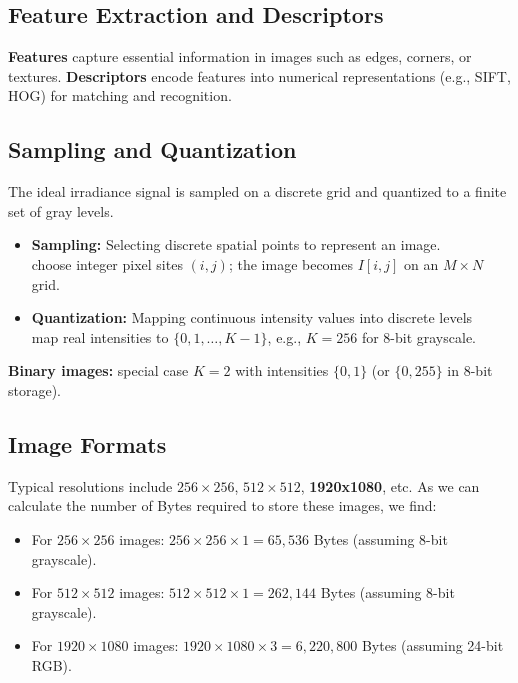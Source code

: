 \subsection{Feature Extraction and Descriptors}
\textbf{Features} capture essential information in images such as edges, corners, or textures.  
\textbf{Descriptors} encode features into numerical representations (e.g., SIFT, HOG) for matching and recognition.

\subsection{Sampling and Quantization}
The ideal irradiance signal is sampled on a discrete grid and quantized to a finite set of gray levels.
\begin{itemize}
    \item \textbf{Sampling:} Selecting discrete spatial points to represent an image.\\
    choose integer pixel sites $(i,j)$; the image becomes $I[i,j]$ on an $M\times N$ grid.
    \item \textbf{Quantization:} Mapping continuous intensity values into discrete levels \\
    map real intensities to $\{0,1,\dots,K-1\}$, e.g., $K=256$ for 8-bit grayscale.
\end{itemize}

\noindent \textbf{Binary images:} special case $K=2$ with intensities $\{0,1\}$ (or $\{0,255\}$ in 8-bit storage).




\subsection{Image Formats}
Typical resolutions include $256\times 256$, $512\times 512$, \textbf{1920x1080}, etc.%
As we can calculate the number of Bytes required to store these images, we find:

\begin{itemize}
    \item For $256\times 256$ images: $256 \times 256 \times 1 = 65,536$ Bytes (assuming 8-bit grayscale).
    \item For $512\times 512$ images: $512 \times 512 \times 1 = 262,144$ Bytes (assuming 8-bit grayscale).
    \item For $1920\times 1080$ images: $1920 \times 1080 \times 3 = 6,220,800$ Bytes (assuming 24-bit RGB).
\end{itemize}

